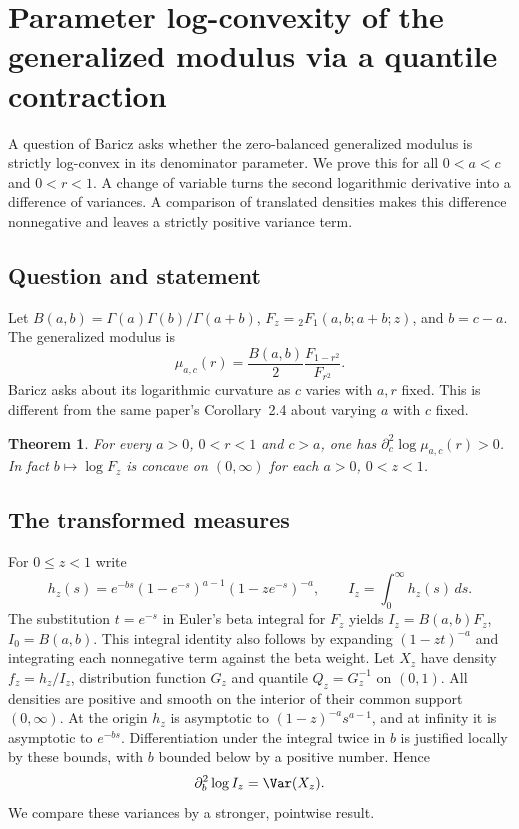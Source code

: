 \documentclass[11pt,a4paper]{article}
\numberwithin{equation}{section}
\newtheorem{theorem}{Theorem}[section]
\theoremstyle{definition}
\theoremstyle{remark}
\newenvironment{sectionabstract}{\par\smallskip\begingroup\small\noindent}{\par\endgroup\medskip}
\begin{document}
\section{\texorpdfstring{Parameter log-convexity of the generalized modulus via a quantile contraction}{Parameter log-convexity of the generalized modulus via a quantile contraction}}\label{section:r43heisei}
\par\medskip


\begin{sectionabstract}
A question of Baricz asks whether the zero-balanced generalized modulus is strictly log-convex in its denominator parameter. We prove this for all $0<a<c$ and $0<r<1$. A change of variable turns the second logarithmic derivative into a difference of variances. A comparison of translated densities makes this difference nonnegative and leaves a strictly positive variance term.
\end{sectionabstract}

\subsection{Question and statement}
Let $B(a,b)=\Gamma(a)\Gamma(b)/\Gamma(a+b)$, $F_z={}_2F_1(a,b;a+b;z)$, and $b=c-a$. The generalized modulus is
\[
 \mu_{a,c}(r)=\frac{B(a,b)}{2}\frac{F_{1-r^2}}{F_{r^2}}.
\]
Baricz \cite[p.~3227, Open Problems (a)]{r43heisei:baricz} asks about its logarithmic curvature as $c$ varies with $a,r$ fixed. This is different from the same paper's Corollary~2.4 about varying $a$ with $c$ fixed.
\begin{theorem}
For every $a>0$, $0<r<1$ and $c>a$, one has $\partial_c^2\log\mu_{a,c}(r)>0$. In fact $b\mapsto\log F_z$ is concave on $(0,\infty)$ for each $a>0$, $0<z<1$.
\end{theorem}

\subsection{The transformed measures}
For $0\le z<1$ write
\[
 h_z(s)=e^{-bs}(1-e^{-s})^{a-1}(1-ze^{-s})^{-a},\qquad
 I_z=\int_0^\infty h_z(s)\,ds .
\]
The substitution $t=e^{-s}$ in Euler's beta integral for $F_z$ yields $I_z=B(a,b)F_z$, $I_0=B(a,b)$. This integral identity also follows by expanding $(1-zt)^{-a}$ and integrating each nonnegative term against the beta weight. Let $X_z$ have density $f_z=h_z/I_z$, distribution function $G_z$ and quantile $Q_z=G_z^{-1}$ on $(0,1)$. All densities are positive and smooth on the interior of their common support $(0,\infty)$. At the origin $h_z$ is asymptotic to $(1-z)^{-a}s^{a-1}$, and at infinity it is asymptotic to $e^{-bs}$. Differentiation under the integral twice in $b$ is justified locally by these bounds, with $b$ bounded below by a positive number. Hence
\begin{equation}\label{r43heisei:var}
 \partial_b^2\log I_z=\Var(X_z).
\end{equation}
We compare these variances by a stronger, pointwise result.
\end{document}
